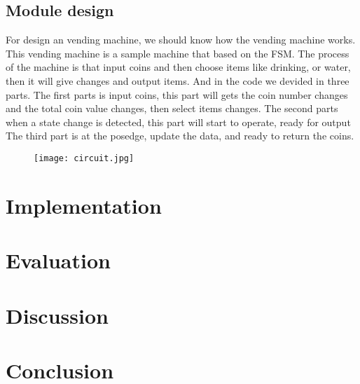 \documentclass[12pt,a4paper]{article}
\begin{document}
\subsection{Module design}

For design an vending machine, we should know how the vending machine works.
This vending machine is a sample machine that based on the FSM.
The process of the machine is that input coins and then choose items like drinking, or water, then it will give changes and output items.
And in the code we devided in three parts. 
The first parts is input coins, this part will gets the coin number changes and the total coin value changes, then select items changes.
The second parts when a state change is detected, this part will start to operate, ready for output
The third part is at the posedge, update the data, and ready to return the coins. 


\begin{figure}[H]
  \centering
  \texttt{[image: circuit.jpg]}
  \end{figure}


\newpage

\section{Implementation}


\newpage

\section{Evaluation}



\newpage
\section{Discussion}



\section{Conclusion}
\end{document}

